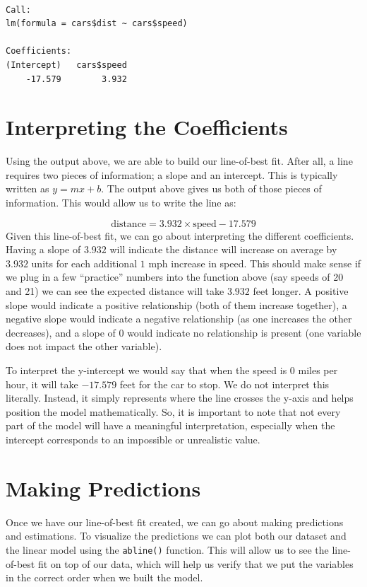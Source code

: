 \documentclass[
  letterpaper,
  DIV=11,
  numbers=noendperiod]{scrreprt}
\begin{document}
\begin{verbatim}

Call:
lm(formula = cars$dist ~ cars$speed)

Coefficients:
(Intercept)   cars$speed  
    -17.579        3.932  
\end{verbatim}

\section{Interpreting the
Coefficients}\label{interpreting-the-coefficients}

Using the output above, we are able to build our line-of-best fit. After
all, a line requires two pieces of information; a slope and an
intercept. This is typically written as \(y=mx+b\). The output above
gives us both of those pieces of information. This would allow us to
write the line as:

\[ \text{distance} = 3.932\times \text{speed} - 17.579 \] Given this
line-of-best fit, we can go about interpreting the different
coefficients. Having a slope of \(3.932\) will indicate the distance
will increase on average by \(3.932\) units for each additional \(1\)
mph increase in speed. This should make sense if we plug in a few
``practice'' numbers into the function above (say speeds of 20 and 21)
we can see the expected distance will take \(3.932\) feet longer. A
positive slope would indicate a positive relationship (both of them
increase together), a negative slope would indicate a negative
relationship (as one increases the other decreases), and a slope of 0
would indicate no relationship is present (one variable does not impact
the other variable).

To interpret the y-intercept we would say that when the speed is \(0\)
miles per hour, it will take \(-17.579\) feet for the car to stop. We do
not interpret this literally. Instead, it simply represents where the
line crosses the y-axis and helps position the model mathematically. So,
it is important to note that not every part of the model will have a
meaningful interpretation, especially when the intercept corresponds to
an impossible or unrealistic value.

\section{Making Predictions}\label{making-predictions}

Once we have our line-of-best fit created, we can go about making
predictions and estimations. To visualize the predictions we can plot
both our dataset and the linear model using the \texttt{abline()}
function. This will allow us to see the line-of-best fit on top of our
data, which will help us verify that we put the variables in the correct
order when we built the model.
\end{document}
